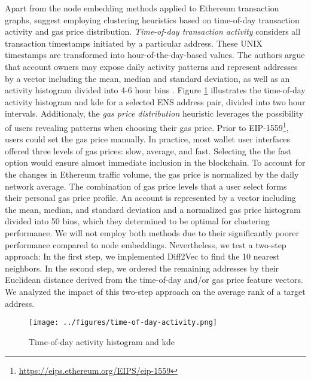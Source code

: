 \documentclass[12pt,a4paper,titlepage,oneside,english]{article}
\begin{document}
Apart from the node embedding methods applied to Ethereum transaction graphs, \cite{Beres2020} suggest employing clustering heuristics based on time-of-day transaction activity and gas price distribution. \newline
\textit{Time-of-day transaction activity} considers all transaction timestamps initiated by a particular address. These UNIX timestamps are transformed into hour-of-the-day-based values. The authors argue that account owners may expose daily activity patterns and represent addresses by a vector including the mean, median and standard deviation, as well as an activity histogram divided into 4-6 hour bins \citep{Beres2020}.  Figure \ref{fig:ToD} illustrates the time-of-day activity histogram and kde for a selected ENS address pair, divided into two hour intervals.\newline
Additionaly, the \textit{gas price distribution} heuristic leverages the possibility of users revealing patterns when choosing their gas price. Prior to EIP-1559\footnote{\url{https://eips.ethereum.org/EIPS/eip-1559}}, users could set the gas price manually. In practice, most wallet user interfaces offered three levels of gas prices: slow, average, and fast. Selecting the the fast option would ensure almost immediate inclusion in the blockchain. To account for the changes in Ethereum traffic volume, the gas price is normalized by the daily network average. The combination of gas price levels that a user select forms their personal gas price profile. An account is represented by a vector including the mean, median, and standard deviation and a normalized gas price histogram divided into 50 bins, which they determined to be optimal for clustering performance. \citep{Beres2020} \newline
We will not employ both methods due to their significantly poorer performance compared to node embeddings. Nevertheless, we test a two-step approach: In the first step, we implemented Diff2Vec to find the 10 nearest neighbors. In the second step, we ordered the remaining addresses by their Euclidean distance derived from the time-of-day and/or gas price feature vectors. We analyzed the impact of this two-step approach on the average rank of a target address.

\begin{figure}[h!]
	\centering
	\texttt{[image: ../figures/time-of-day-activity.png]}
	\caption{Time-of-day activity histogram and kde}
	\label{fig:ToD}
\end{figure} 
\end{document}

